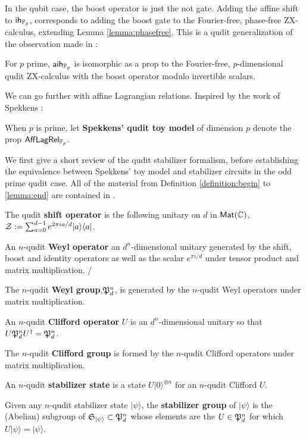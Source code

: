 In the qubit case, the boost operator is just the not gate.  Adding the affine shift to ${\sf ih}_{\mathbb{F}_p}$, corresponds to adding the boost gate to the  Fourier-free, phase-free ZX-calculus, extending Lemma \ref{lemma:phasefree}.  This is a qudit generalization of the observation made in \cite{distzx}:

\begin{lemma}
For $p$ prime, ${\sf aih}_{\mathbb{F}_p}$ is isomorphic as a prop  to the Fourier-free, $p$-dimensional qudit ZX-calculus with the boost operator modulo invertible scalars.
\end{lemma}




We can go further with affine Lagrangian relations.  Inspired by the work of Spekkens \cite{spekkens,spekkens2016quasi}:


\begin{definition}
When $p$ is prime, let {\bf Spekkens' qudit toy model} of dimension $p$  denote the prop $\mathsf{Aff}\mathsf{Lag}\mathsf{Rel}_{\mathbb{F}_p}$.
\end{definition}

We first give a short review of the qudit stabilizer formalism, before establishing the equivalence between Spekkens' toy model and stabilizer circuits in the odd prime qudit case.  All of the material from Definition \ref{definition:begin} to \ref{lemma:end} are contained in \cite{generators}.


\begin{definition}
\label{definition:begin}
The qudit {\bf shift operator} is the following unitary on $d$ in $\mathsf{Mat}(\mathbb{C})$, 
${\cal Z} := \sum_{a =0}^{d-1} e^{2\pi i a/d} |  a  \rangle\langle a |$.



An $n$-qudit {\bf Weyl operator} an $d^n$-dimensional unitary generated by the shift, boost and identity operators as well as the scalar $e^{\pi i /d}$ under tensor product and matrix multiplication. /

The $n$-qudit {\bf Weyl group},${\frak P}_d^{ n}$, is generated by the $n$-qudit Weyl operators under matrix multiplication.

An $n$-qudit {\bf Clifford operator} $U$ is an $d^n$-dimensional unitary so that $U {\frak P}_d^{ n} U^\dag = {\frak P}_d^{ n}$.

The $n$-qudit {\bf Clifford group} is formed by the $n$-qudit Clifford operators under matrix multiplication.

An $n$-qudit {\bf stabilizer state} is a state $ U |0\rangle^{\otimes n}$ for an $n$-qudit Clifford $U$.

Given any $n$-qudit stabilizer state $|\psi \rangle$,  the {\bf stabilizer group} of $|\psi \rangle$  is the (Abelian) subgroup of ${\frak S}_{|\psi\rangle} \subset {\frak P}_d^{ n}$ whose elements are the $U \in {\frak P}_d^{ n}$ for which $U|\psi \rangle=|\psi \rangle$.
\end{definition}


